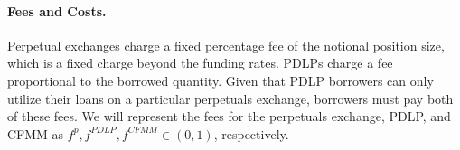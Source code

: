 

\paragraph{Fees and Costs.}
Perpetual exchanges charge a fixed percentage fee of the notional position size, which is a fixed charge beyond the funding rates.
PDLPs charge a fee proportional to the borrowed quantity.  
Given that PDLP borrowers can only utilize their loans on a particular perpetuals exchange, borrowers must pay both of these fees.
We will represent the fees for the perpetuals exchange, PDLP, and CFMM as $f^{p}, f^{PDLP}, f^{CFMM} \in (0, 1)$, respectively.


